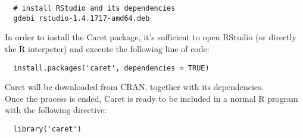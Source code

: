\documentclass{article}
\begin{document}
\begin{lstlisting}
  # install RStudio and its dependencies
  gdebi rstudio-1.4.1717-amd64.deb
\end{lstlisting}

\pagebreak

In order to install the Caret package, it's sufficient to open RStudio (or directly the R interpeter) and execute the following line of code:\\

\begin{lstlisting}
  install.packages('caret', dependencies = TRUE)
\end{lstlisting}

Caret will be downloaded from CRAN, together with its dependencies.\\

Once the process is ended, Caret is ready to be included in a normal R program with the following directive:\\

\begin{lstlisting}
  library('caret')
\end{lstlisting}
\end{document}
